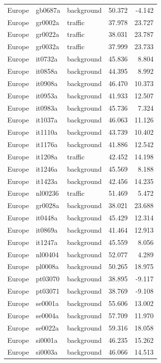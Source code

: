 \documentclass{article}
\begin{document}
\begin{longtable}{lllrr}
Europe & gb0687a & background & 50.372 & -4.142 \\ 
Europe & gr0002a & traffic & 37.978 & 23.727 \\ 
Europe & gr0022a & traffic & 38.031 & 23.787 \\ 
Europe & gr0032a & traffic & 37.999 & 23.733 \\ 
Europe & it0732a & background & 45.836 & 8.804 \\ 
Europe & it0858a & background & 44.395 & 8.992 \\ 
Europe & it0908a & background & 46.470 & 10.373 \\ 
Europe & it0953a & background & 41.933 & 12.507 \\ 
Europe & it0983a & background & 45.736 & 7.324 \\ 
Europe & it1037a & background & 46.063 & 11.126 \\ 
Europe & it1110a & background & 43.739 & 10.402 \\ 
Europe & it1176a & background & 41.886 & 12.542 \\ 
Europe & it1208a & traffic & 42.452 & 14.198 \\ 
Europe & it1246a & background & 45.569 & 8.188 \\ 
Europe & it1423a & background & 42.456 & 14.235 \\ 
Europe & nl00236 & traffic & 51.469 & 5.472 \\ 
Europe & gr0028a & background & 38.021 & 23.688 \\ 
Europe & it0448a & background & 45.429 & 12.314 \\ 
Europe & it0869a & background & 41.464 & 12.913 \\ 
Europe & it1247a & background & 45.559 & 8.056 \\ 
Europe & nl00404 & background & 52.077 & 4.289 \\ 
Europe & pl0008a & background & 50.265 & 18.975 \\ 
Europe & pt03070 & background & 38.895 & -9.117 \\ 
Europe & pt03071 & background & 38.769 & -9.108 \\ 
Europe & se0001a & background & 55.606 & 13.002 \\ 
Europe & se0004a & background & 57.709 & 11.970 \\ 
Europe & se0022a & background & 59.316 & 18.058 \\ 
Europe & si0001a & background & 46.235 & 15.262 \\ 
Europe & si0003a & background & 46.066 & 14.513 \\ 

\end{longtable}
\end{document}
